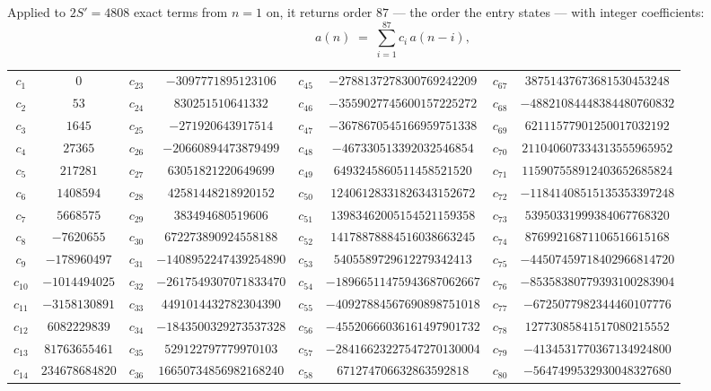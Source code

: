 \documentclass[11pt,a4paper]{article}
\theoremstyle{plain}
\theoremstyle{definition}
\begin{document}
Applied to $2S'=4808$ exact terms from $n=1$ on, it returns order $87$ --- the
order the entry states --- with integer coefficients:
\[
a(n)\;=\;\sum_{i=1}^{87}c_i\,a(n-i),
\]
\begin{center}\small
\begin{tabular}{cccccccc}
$c_{1}$ & $0$ & $c_{23}$ & $-3097771895123106$ & $c_{45}$ & $-2788137278300769242209$ & $c_{67}$ & $38751437673681530453248$ \\
$c_{2}$ & $53$ & $c_{24}$ & $830251510641332$ & $c_{46}$ & $-3559027745600157225272$ & $c_{68}$ & $-48821084448384480760832$ \\
$c_{3}$ & $1645$ & $c_{25}$ & $-271920643917514$ & $c_{47}$ & $-3678670545166959751338$ & $c_{69}$ & $62111577901250017032192$ \\
$c_{4}$ & $27365$ & $c_{26}$ & $-20660894473879499$ & $c_{48}$ & $-467330513392032546854$ & $c_{70}$ & $211040607334313555965952$ \\
$c_{5}$ & $217281$ & $c_{27}$ & $63051821220649699$ & $c_{49}$ & $6493245860511458521520$ & $c_{71}$ & $115907558912403652685824$ \\
$c_{6}$ & $1408594$ & $c_{28}$ & $42581448218920152$ & $c_{50}$ & $12406128331826343152672$ & $c_{72}$ & $-11841408515135353397248$ \\
$c_{7}$ & $5668575$ & $c_{29}$ & $383494680519606$ & $c_{51}$ & $13983462005154521159358$ & $c_{73}$ & $53950331999384067768320$ \\
$c_{8}$ & $-7620655$ & $c_{30}$ & $672273890924558188$ & $c_{52}$ & $14178878884516038663245$ & $c_{74}$ & $87699216871106516615168$ \\
$c_{9}$ & $-178960497$ & $c_{31}$ & $-1408952247439254890$ & $c_{53}$ & $5405589729612279342413$ & $c_{75}$ & $-44507459718402966814720$ \\
$c_{10}$ & $-1014494025$ & $c_{32}$ & $-2617549307071833470$ & $c_{54}$ & $-18966511475943687062667$ & $c_{76}$ & $-85358380779393100283904$ \\
$c_{11}$ & $-3158130891$ & $c_{33}$ & $4491014432782304390$ & $c_{55}$ & $-40927884567690898751018$ & $c_{77}$ & $-6725077982344460107776$ \\
$c_{12}$ & $6082229839$ & $c_{34}$ & $-1843500329273537328$ & $c_{56}$ & $-45520666036161497901732$ & $c_{78}$ & $12773085841517080215552$ \\
$c_{13}$ & $81763655461$ & $c_{35}$ & $529122797779970103$ & $c_{57}$ & $-28416623227547270130004$ & $c_{79}$ & $-4134531770367134924800$ \\
$c_{14}$ & $234678684820$ & $c_{36}$ & $16650734856982168240$ & $c_{58}$ & $671274706632863592818$ & $c_{80}$ & $-5647499532930048327680$ \\

\end{tabular}
\end{center}
\end{document}
